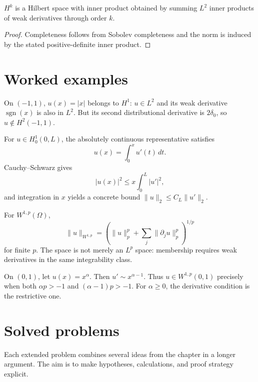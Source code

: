 \begin{theorem}\label{thm:iii21-03}
$H^k$ is a Hilbert space with inner product obtained by summing $L^2$ inner products of weak derivatives through order $k$.
\begin{proof}
Completeness follows from Sobolev completeness and the norm is induced by the stated positive-definite inner product.
\end{proof}
\end{theorem}

\section{Worked examples}

\begin{example}\label{ex:iii21-worked-01}
On \((-1,1)\), \(u(x)=|x|\) belongs to \(H^1\): \(u\in L^2\) and its weak
derivative \(\operatorname{sgn}(x)\) is also in \(L^2\). But its second
distributional derivative is \(2\delta_0\), so \(u\notin H^2(-1,1)\).
\end{example}

\begin{example}\label{ex:iii21-worked-02}
For \(u\in H_0^1(0,L)\), the absolutely continuous representative satisfies
\[
u(x)=\int_0^x u'(t)\,dt.
\]
Cauchy--Schwarz gives
\[
|u(x)|^2\le x\int_0^L|u'|^2,
\]
and integration in \(x\) yields a concrete bound
\(\|u\|_2\le C_L\|u'\|_2\).
\end{example}

\begin{example}\label{ex:iii21-worked-03}
For \(W^{1,p}(\Omega)\),
\[
\|u\|_{W^{1,p}}
=\left(\|u\|_p^p+\sum_j\|\partial_ju\|_p^p\right)^{1/p}
\]
for finite \(p\). The space is not merely an \(L^p\) space: membership requires
weak derivatives in the same integrability class.
\end{example}

\begin{example}\label{ex:iii21-worked-04}
On \((0,1)\), let \(u(x)=x^\alpha\). Then
\(u'\sim x^{\alpha-1}\). Thus \(u\in W^{1,p}(0,1)\) precisely when both
\(\alpha p>-1\) and \((\alpha-1)p>-1\). For \(\alpha\ge0\), the derivative
condition is the restrictive one.
\end{example}

\section{Solved problems}
Each extended problem combines several ideas from the chapter in a longer argument. The aim is to make hypotheses, calculations, and proof strategy explicit.


